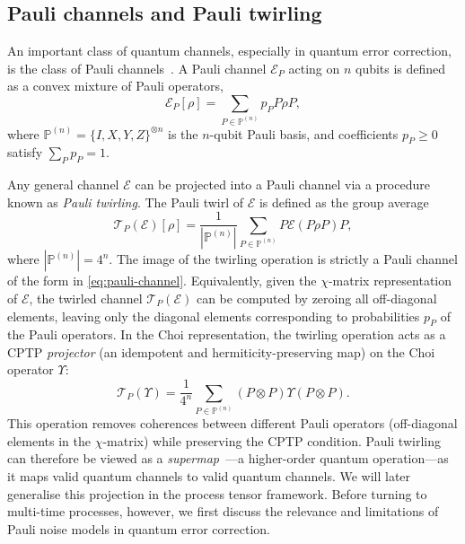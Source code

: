 \subsection{Pauli channels and Pauli twirling}
An important class of quantum channels, especially in quantum error correction, is the class of Pauli channels~\cite{nielsenQuantumComputationQuantum2010}. A Pauli channel \(\mathcal{E}_P\) acting on \(n\) qubits is defined as a convex mixture of Pauli operators,
\begin{equation}\label{eq:pauli-channel}
    \mathcal{E}_P[\rho] = \sum_{P \in \mathbb{P}^{(n)}} p_P P \rho P,
\end{equation}
where \(\mathbb{P}^{(n)} = \{I, X, Y, Z\}^{\otimes n}\) is the \(n\)-qubit Pauli basis, and coefficients \(p_P \geq 0\) satisfy \(\sum_{P} p_P = 1\). 

Any general channel \(\mathcal{E}\) can be projected into a Pauli channel via a procedure known as \emph{Pauli twirling}. The Pauli twirl of \(\mathcal{E}\) is defined as the group average
\begin{equation}\label{eq:pauli-twirl}
    \mathcal{T}_P(\mathcal{E})[\rho] = \frac{1}{|\mathbb{P}^{(n)}|} \sum_{P \in \mathbb{P}^{(n)}} P \mathcal{E}(P \rho P) P,
\end{equation}
where \(|\mathbb{P}^{(n)}| = 4^n\). The image of the twirling operation is strictly a Pauli channel of the form in \cref{eq:pauli-channel}. Equivalently, given the $\chi$-matrix representation of \(\mathcal{E}\), the twirled channel \(\mathcal{T}_P(\mathcal{E})\) can be computed by zeroing all off-diagonal elements, leaving only the diagonal elements corresponding to probabilities \(p_P\) of the Pauli operators. In the Choi representation, the twirling operation acts as a CPTP \emph{projector} (an idempotent and hermiticity-preserving map) on the Choi operator \(\Upsilon\):
\begin{equation}
    \mathcal{T}_P(\Upsilon) = \frac{1}{4^n} \sum_{P \in \mathbb{P}^{(n)}} (P \otimes P) \Upsilon (P \otimes P).
\end{equation}
This operation removes coherences between different Pauli operators (off-diagonal elements in the \(\chi\)-matrix) while preserving the CPTP condition. Pauli twirling can therefore be viewed as a \emph{supermap}~\cite{chiribellaQuantumCircuitArchitecture2008}---a higher-order quantum operation---as it maps valid quantum channels to valid quantum channels. We will later generalise this projection in the process tensor framework. Before turning to multi-time processes, however, we first discuss the relevance and limitations of Pauli noise models in quantum error correction. 

